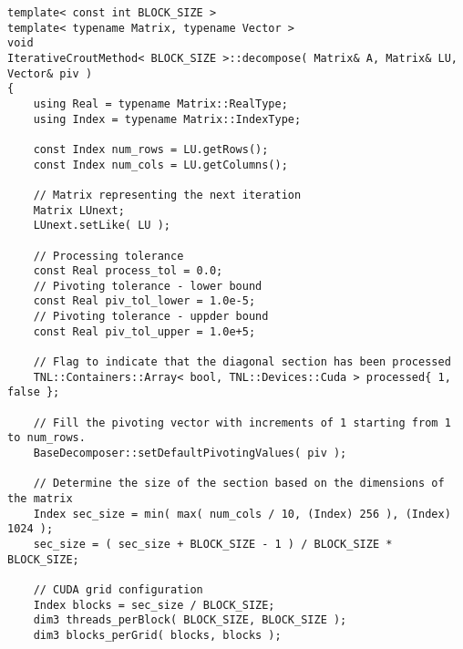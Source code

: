 \begin{lstlisting}[caption={Excerpt from the implementation of ICM\_\textit{x}PP.
The template parameter \code{BLOCK\_SIZE} is equivalent to \textit{x} in ICM\_\textit{x}PP.
On input, matrix \code{A} is assumed to contain the values of $\mathbf{A}$, matrix \code{LU} is assumed to contain the initial estimate of the decomposition, and \code{piv} is expected to be appropriately sized and allocated on the Host.
On output, matrix \code{LU} contains the values of matrices $\mathbf{L}$ and $\mathbf{U}$ in the format presented in Equation~\ref{Equation:implementation->decomposition-project->implemented-solutions->decomposers->CMPP}, and \code{piv} contains the row permutations.
The \code{synchronizeStreams()} function is included below the \code{decompose()} method.
The \code{pivotBadElement()} function is shown in Listing~\ref{Listing:ICMxPP-implementation-pivot-bad-element}.
The code has been slightly modified for brevity, for example, the checks for appropriate sizing of matrices and vectors have been removed.},label={Listing:ICMxPP-implementation-excerpt}]
template< const int BLOCK_SIZE >
template< typename Matrix, typename Vector >
void
IterativeCroutMethod< BLOCK_SIZE >::decompose( Matrix& A, Matrix& LU, Vector& piv )
{
	using Real = typename Matrix::RealType;
	using Index = typename Matrix::IndexType;
	
	const Index num_rows = LU.getRows();
	const Index num_cols = LU.getColumns();
	
	// Matrix representing the next iteration
	Matrix LUnext;
	LUnext.setLike( LU );
	
	// Processing tolerance
	const Real process_tol = 0.0;
	// Pivoting tolerance - lower bound
	const Real piv_tol_lower = 1.0e-5;
	// Pivoting tolerance - uppder bound
	const Real piv_tol_upper = 1.0e+5;

	// Flag to indicate that the diagonal section has been processed
	TNL::Containers::Array< bool, TNL::Devices::Cuda > processed{ 1, false };
	
	// Fill the pivoting vector with increments of 1 starting from 1 to num_rows.
	BaseDecomposer::setDefaultPivotingValues( piv );
	
	// Determine the size of the section based on the dimensions of the matrix
	Index sec_size = min( max( num_cols / 10, (Index) 256 ), (Index) 1024 );
	sec_size = ( sec_size + BLOCK_SIZE - 1 ) / BLOCK_SIZE * BLOCK_SIZE;
	
	// CUDA grid configuration
	Index blocks = sec_size / BLOCK_SIZE;
	dim3 threads_perBlock( BLOCK_SIZE, BLOCK_SIZE );
	dim3 blocks_perGrid( blocks, blocks );
	

\end{lstlisting}
